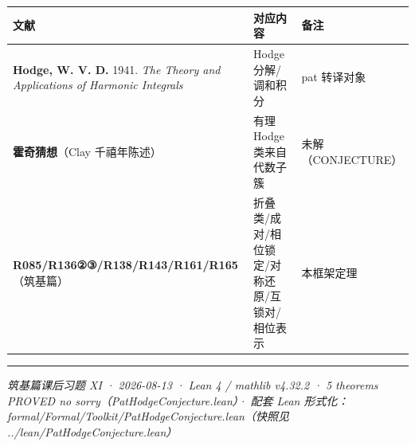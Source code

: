 \documentclass[
]{article}
\newcounter{none} %
\begin{document}
{\def\LTcaptype{none} %
\begin{longtable}[]{@{}
  >{\raggedright\arraybackslash}p{}
  >{\raggedright\arraybackslash}p{}
  >{\raggedright\arraybackslash}p{}@{}}
\toprule\noalign{}
\begin{minipage}[b]{\linewidth}\raggedright
文献
\end{minipage} & \begin{minipage}[b]{\linewidth}\raggedright
对应内容
\end{minipage} & \begin{minipage}[b]{\linewidth}\raggedright
备注
\end{minipage} \\
\midrule\noalign{}
\endhead
\bottomrule\noalign{}
\endlastfoot
\textbf{Hodge, W. V. D.} 1941. \emph{The Theory and Applications of
Harmonic Integrals} & Hodge 分解/调和积分 & pat 转译对象 \\
\textbf{霍奇猜想}（Clay 千禧年陈述） & 有理 Hodge 类来自代数子簇 &
未解（CONJECTURE） \\
\textbf{R085/R136②③/R138/R143/R161/R165}（筑基篇） &
折叠类/成对/相位锁定/对称还原/互锁对/相位表示 & 本框架定理 \\
\end{longtable}
}

\begin{center}\rule{0.5\linewidth}{0.5pt}\end{center}

\emph{筑基篇课后习题 XI · 2026-08-13 · Lean 4 / mathlib v4.32.2 · 5
theorems PROVED no sorry（PatHodgeConjecture.lean）· 配套 Lean
形式化：formal/Formal/Toolkit/PatHodgeConjecture.lean（快照见
../lean/PatHodgeConjecture.lean）}
\end{document}
